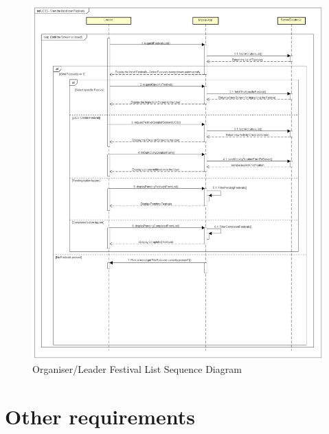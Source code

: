 				\begin{figure}[H]
					\includegraphics[width=\linewidth]{diagrams/UC13 - View the list of own Festivals.png}
					\caption{Organiser/Leader Festival List Sequence Diagram}
					\label{fig:sd_uc13_festival_list}
				\end{figure}
				
				\eject
	
		\section{Other requirements}
			 
